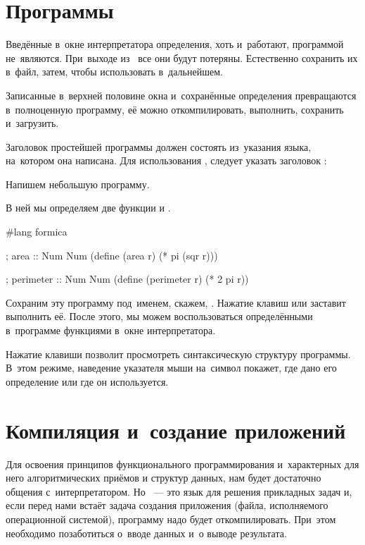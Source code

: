 \section[2]{Программы \Scheme}%
Введённые в~окне интерпретатора определения, хоть и~работают, программой не~являются. При~выходе из~ все они будут потеряны. Естественно сохранить их в~файл, затем, чтобы использовать в~дальнейшем.

Записанные в~верхней половине окна  и~сохранённые определения превращаются в~полноценную программу, её можно откомпилировать, выполнить, сохранить и~загрузить.

Заголовок простейшей программы должен состоять из~указания языка, на~котором она написана. Для использования \Scheme, следует указать заголовок :

\begin{example}{Напишем небольшую программу.

В ней мы определяем две функции  и .}
\begin{ExampleCode}[emph={r}]
#lang formica

; area :: Num \arrow Num
(define (area r)
  (* pi (sqr r)))

; perimeter :: Num \arrow Num
(define (perimeter r)
  (* 2 pi r))
\end{ExampleCode}
\end{example}

Сохраним эту программу под~именем, скажем, . Нажатие клавиш  или  заставит  выполнить её. После этого, мы можем воспользоваться определёнными в~программе функциями в~окне интерпретатора.

Нажатие клавиши  позволит просмотреть синтаксическую структуру программы. В~этом режиме, наведение указателя мыши на~символ покажет, где дано его определение или где  он используется.


\section[4]{Компиляция и~создание приложений}\label{compilation}%
Для освоения принципов функционального программирования и~характерных для него алгоритмических приёмов и структур данных, нам будет достаточно общения с~интерпретатором. Но \Scheme~--- это язык для решения прикладных задач и, если перед нами встаёт задача создания приложения (файла, исполняемого операционной системой), программу надо будет откомпилировать. При~этом необходимо позаботиться о~вводе данных и~о выводе результата.

